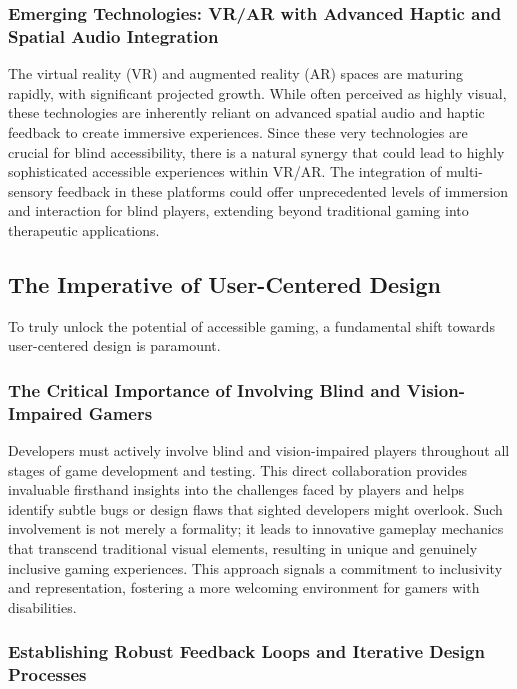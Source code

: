 \subsubsection{Emerging Technologies: VR/AR with Advanced Haptic and Spatial Audio Integration}

The virtual reality (VR) and augmented reality (AR) spaces are maturing rapidly, with significant projected growth\supercite{SlavnaStudio2025}. While often perceived as highly visual, these technologies are inherently reliant on advanced spatial audio and haptic feedback to create immersive experiences\supercite{SlavnaStudio2025}. Since these very technologies are crucial for blind accessibility, there is a natural synergy that could lead to highly sophisticated accessible experiences within VR/AR. The integration of multi-sensory feedback in these platforms could offer unprecedented levels of immersion and interaction for blind players, extending beyond traditional gaming into therapeutic applications\supercite{SlavnaStudio2025}.

\subsection{The Imperative of User-Centered Design}

To truly unlock the potential of accessible gaming, a fundamental shift towards user-centered design is paramount.

\subsubsection{The Critical Importance of Involving Blind and Vision-Impaired Gamers}

Developers must actively involve blind and vision-impaired players throughout all stages of game development and testing\supercite{ResearchGateInclusiveGames}. This direct collaboration provides invaluable firsthand insights into the challenges faced by players and helps identify subtle bugs or design flaws that sighted developers might overlook\supercite{ResearchGateInclusiveGames}. Such involvement is not merely a formality; it leads to innovative gameplay mechanics that transcend traditional visual elements, resulting in unique and genuinely inclusive gaming experiences\supercite{ResearchGateInclusiveGames}. This approach signals a commitment to inclusivity and representation, fostering a more welcoming environment for gamers with disabilities.

\subsubsection{Establishing Robust Feedback Loops and Iterative Design Processes}

